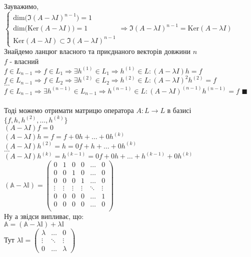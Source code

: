 \documentclass[a4paper, 14pt]{extarticle}
\def\bigline{\vspace{5mm}\\}
\def\qed{$\blacksquare$}
\def\dim#1{\textrm{dim} {#1}}
\begin{document}
Зауважимо,\\
$\begin{cases}
\dim (\Im(A-\lambda I)^{n-1}) = 1\\
\dim (\textrm{Ker} (A-\lambda I)) = 1\\
\textrm{Ker} (A-\lambda I) \subset \Im(A-\lambda I)^{n-1}
\end{cases} \Rightarrow \Im(A-\lambda I)^{n-1} = \textrm{Ker}(A-\lambda I)
$\\
Знайдемо ланцюг власного та приєднаного векторів довжини $n$\\
$f$ - власний\\
$f \in L_{n-1} \Rightarrow f \in L_1 \Rightarrow \exists h^{(1)} \in L_1 \Rightarrow h^{(1)} \in L: (A-\lambda I)h = f$\\
$f \in L_{n-1} \Rightarrow f \in L_2 \Rightarrow \exists h^{(2)} \in L_2 \Rightarrow h^{(2)} \in L: (A-\lambda I)^2 h^{(2)} = f$\\
$\dots$\\
$f \in L_{n-1} \Rightarrow \exists h^{(n-1)} \in L_{n-1} \Rightarrow h^{(n-1)} \in L: (A-\lambda I)^{(n-1)}h^{(n-1)} = f$
 \qed
\\
\bigline
Тоді можемо отримати матрицю оператора $A: L \to L$ в базисі $\{f,h,h^{(2)},\dots,h^{(k)}\}$\\
$(A-\lambda I)f = 0$\\
$(A-\lambda I)h = f = f + 0h + \dots + 0h^{(k)}$\\
$(A-\lambda I)h^{(2)} = h = 0f + h + \dots + 0h^{(k)}$\\
$\dots$\\
$(A-\lambda I)h^{(k)} = h^{(k-1)} = 0f + 0h + \dots + h^{(k-1)} + 0h^{(k)}$\\
$(\mathbb{A}- \lambda \mathbb{I}) = \begin{pmatrix}
0 & 1 & 0 & 0 & \dots & 0 \\
0 & 0 & 1 & 0 & \dots & 0 \\
0 & 0 & 0 & 1 & \dots & 0 \\
\vdots & \vdots & \vdots & \vdots & \ddots & \vdots \\
0 & 0 & 0 & 0 & \dots & 1 \\
0 & 0 & 0 & 0 & \dots & 0 \\
\end{pmatrix}$\\
Ну а звідси випливає, що:\\
$\mathbb{A} = (\mathbb{A} - \lambda \mathbb{I}) + \lambda \mathbb{I}$\\
Тут $\lambda \mathbb{I} = \begin{pmatrix}
\lambda & \dots & 0\\
\vdots & \ddots & \vdots\\
0 & \dots & \lambda
\end{pmatrix}$\\
\end{document}
